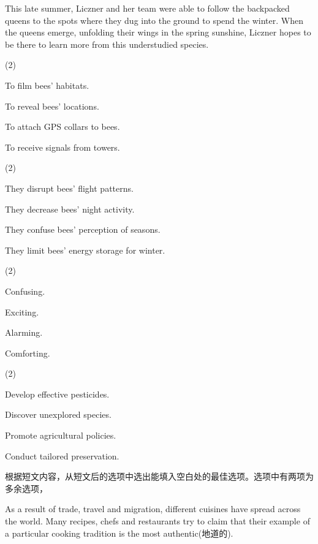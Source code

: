 \documentclass{英语试卷}
\begin{document}
\par This late summer, Liczner and her team were able to follow the backpacked queens to the spots where they dug into the ground to spend the winter. When the queens emerge, unfolding their wings in the spring sunshine, Liczner hopes to be there to learn more from this understudied species.\par
{}
\begin{choices}(2)
  \item To film bees' habitats.
  \item To reveal bees' locations.
  \item To attach GPS collars to bees.
  \item To receive signals from towers.
\end{choices}
\begin{choices}(2)
  \item They disrupt bees' flight patterns.
  \item They decrease bees' night activity.
  \item They confuse bees' perception of seasons.
  \item They limit bees' energy storage for winter.
\end{choices}
\begin{choices}(2)
  \item Confusing.
  \item Exciting.
  \item Alarming.
  \item Comforting.
\end{choices}
\begin{choices}(2)
  \item Develop effective pesticides.
  \item Discover unexplored species.
  \item Promote agricultural policies.
  \item Conduct tailored preservation.
\end{choices}
\par 根据短文内容，从短文后的选项中选出能填入空白处的最佳选项。选项中有两项为多余选项，\par
\par As a result of trade, travel and migration, different cuisines have spread across the world. Many recipes, chefs and restaurants try to claim that their example of a particular cooking tradition is the most authentic(地道的). \par
\end{document}
